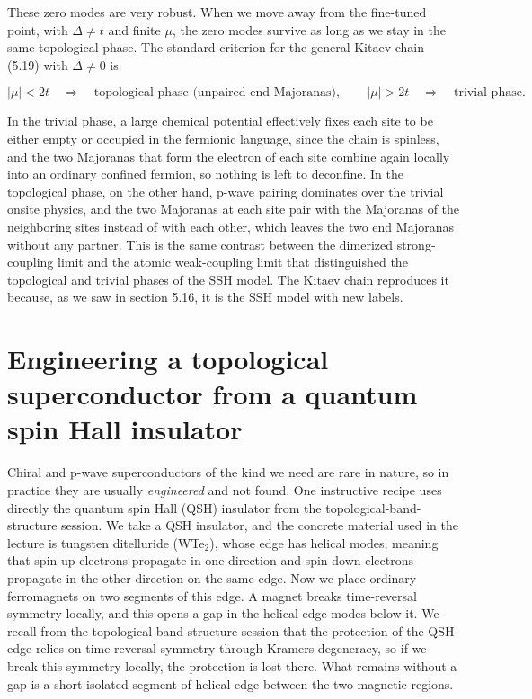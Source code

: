 These zero modes are very robust. When we move away from the fine-tuned point, with $\Delta \ne t$
and finite $\mu$, the zero modes survive as long as we stay in the same topological phase. The
standard criterion for the general Kitaev chain (5.19) with $\Delta \ne 0$ is

\begin{equation}
|\mu| < 2t \quad \Longrightarrow \quad \text{topological phase (unpaired end Majoranas)}, \qquad |\mu| > 2t \quad \Longrightarrow \quad \text{trivial phase.}
\end{equation}

In the trivial phase, a large chemical potential effectively fixes each site to be either empty or
occupied in the fermionic language, since the chain is spinless, and the two Majoranas that form the electron of each site
combine again locally into an ordinary confined fermion, so nothing is left to deconfine. In the
topological phase, on the other hand, p-wave pairing dominates over the trivial onsite physics, and
the two Majoranas at each site pair with the Majoranas of the neighboring sites instead of with each
other, which leaves the two end Majoranas without any partner. This is the same contrast between
the dimerized strong-coupling limit and the atomic weak-coupling limit that distinguished the
topological and trivial phases of the SSH model. The Kitaev chain reproduces it because, as we saw
in section 5.16, it is the SSH model with new labels.

\section{Engineering a topological superconductor from a quantum spin Hall insulator}

Chiral and p-wave superconductors of the kind we need are rare in nature, so in practice they are
usually \emph{engineered} and not found. One instructive recipe uses directly the quantum spin Hall
(QSH) insulator from the topological-band-structure session. We take a QSH insulator, and the
concrete material used in the lecture is tungsten ditelluride (WTe$_2$), whose edge has helical
modes, meaning that spin-up electrons propagate in one direction and spin-down electrons propagate
in the other direction on the same edge. Now we place ordinary ferromagnets on two segments of this
edge. A magnet breaks time-reversal symmetry locally, and this opens a gap in the helical edge modes
below it. We recall from the topological-band-structure session that the protection of the QSH edge
relies on time-reversal symmetry through Kramers degeneracy, so if we break this symmetry locally,
the protection is lost there. What remains without a gap is a short isolated segment of helical edge
between the two magnetic regions.

